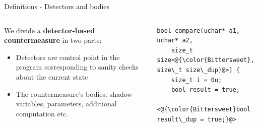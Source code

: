 \begin{frame}[fragile]{Definitions - Detectors and bodies} 
    \begin{small}
        \begin{columns}
            \begin{column}{0.5\textwidth}
                \begin{tiny}  
                    We divide a \textbf{detector-based countermeasure} in two parts:
                    \vspace{0.25cm}
                    
                    \begin{itemize}
                        \item {\color{RedViolet}Detectors} are control point in the program corresponding to sanity checks about the current state
                        \item The {\color{Bittersweet}countermeasure's bodies}: shadow variables, parameters, additional computation etc.
                    \end{itemize}
                    \vspace{0.2cm}
                    
                \end{tiny}
            \end{column}
            \begin{column}{0.5\textwidth}
                \lstset{style=customc}
                \begin{lstlisting}
bool compare(uchar* a1, uchar* a2,
    size_t size<@{\color{Bittersweet}, size\_t size\_dup}@>) {
    size_t i = 0u;
    bool result = true;
    <@{\color{Bittersweet}bool result\_dup = true;}@>
    

\end{lstlisting}
\end{column}
\end{columns}
\end{small}
\end{frame}
